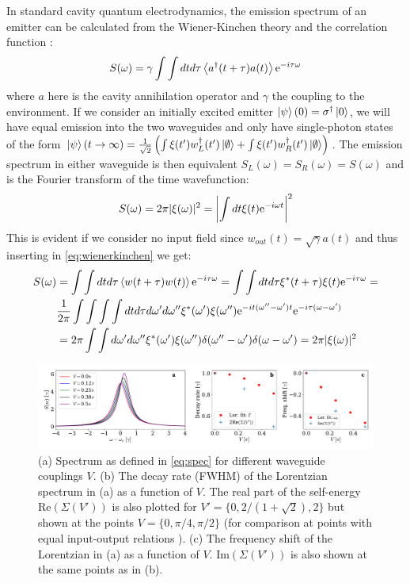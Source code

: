 In standard cavity quantum electrodynamics, the emission spectrum of an emitter can be calculated from the Wiener-Kinchen theory and the correlation function \cite{Steck2007QuantumOptics}:
\begin{equation}
    S(\omega) = \gamma\int \int dt d\tau \expval{a^\dagger(t+\tau) a(t)} \mathrm{e}^{-i\tau \omega} \label{eq:wienerkinchen}
\end{equation}
where $a$ here is the cavity annihilation operator and $\gamma$ the coupling to the environment. If we consider an initially excited emitter $\ket{\psi}(0) = \sigma^\dagger \ket{0}$, we will have equal emission into the two waveguides and only have single-photon states of the form $\ket{\psi}(t \rightarrow \infty) = \frac{1}{\sqrt{2}}\left ( \int \xi(t') w_L^\dagger(t') \ket{\emptyset}+\int \xi(t') w_R^\dagger(t') \ket{\emptyset} \right)$. The emission spectrum in either waveguide is then equivalent $S_L(\omega)=S_R(\omega)=S(\omega)$ and is the Fourier transform of the time wavefunction:
\begin{equation}
    S(\omega) = 2 \pi |\xi(\omega)|^2 = \abs{\int dt \xi(t) \mathrm{e}^{-i\omega t}}^2 \label{eq:spec}
\end{equation}
This is evident if we consider no input field since $w_{out}(t) = \sqrt{\gamma} a(t)$ and thus inserting in \ref{eq:wienerkinchen} we get:
\begin{align}
    S(\omega) &= \int \int dt d\tau \expval{w(t+\tau) w(t)} \mathrm{e}^{-i\tau \omega} = \int \int dt d\tau \xi^*(t+\tau) \xi(t) \mathrm{e}^{-i\tau \omega} = \\
    &\frac{1}{2\pi} \int \int \int \int dt d\tau d\omega^\prime d\omega^{\prime \prime} \xi^*(\omega^{\prime}) \xi(\omega^{\prime \prime}) \mathrm{e}^{-i t (\omega^{\prime\prime }-\omega^{\prime}) t} \mathrm{e}^{-i\tau (\omega - \omega^{\prime})} \\
    & = 2 \pi \int \int d\omega^\prime d\omega^{\prime \prime} \xi^*(\omega^{\prime}) \xi(\omega^{\prime \prime}) \delta(\omega^{\prime \prime}-\omega^{\prime})\delta(\omega-\omega^{\prime}) =  2 \pi |\xi(\omega)|^2
\end{align}
\begin{figure}
    \centering
    \includegraphics[width=\linewidth]{figures/fanoressonance.pdf}
    \caption{(a) Spectrum as defined in \eqref{eq:spec} for different waveguide couplings $V$. (b) The decay rate (FWHM) of the Lorentzian spectrum in (a) as a function of $V$. The real part of the self-energy $\mathrm{Re}(\Sigma(V'))$ is also plotted for $V'=\{0,2/(1+\sqrt{2}),2\}$ but shown at the points $V =\{0,\pi/4,\pi/2\}$ (for comparison at points with equal input-output relations ). (c) The frequency shift of the Lorentzian in (a) as a function of $V$. $\mathrm{Im}(\Sigma(V'))$ is also shown at the same points as in (b).}
    \label{fig:selfenergy}
\end{figure}



